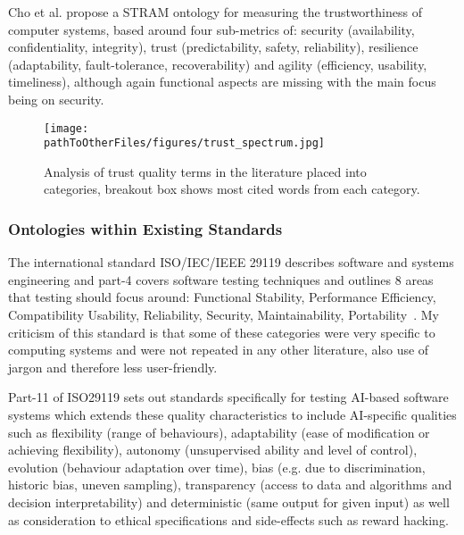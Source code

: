 Cho et al. propose a STRAM ontology for measuring the trustworthiness of computer systems, based around four sub-metrics of: security (availability, confidentiality, integrity), trust (predictability, safety, reliability), resilience (adaptability, fault-tolerance, recoverability) and agility (efficiency, usability, timeliness), although again functional aspects are missing with the main focus being on security.

\begin{figure*}[]
    \centering
    \texttt{[image: \\pathToOtherFiles/figures/trust\_spectrum.jpg]}
    \caption{Analysis of trust quality terms in the literature placed into categories, breakout box shows most cited words from each category.}
    \label{fig:trust_spectrum}
\end{figure*}


\subsubsection{Ontologies within Existing Standards}

The international standard ISO/IEC/IEEE 29119 describes software and systems engineering and part-4 covers software testing techniques and outlines 8 areas that testing should focus around: Functional Stability, Performance Efficiency, Compatibility
Usability, Reliability, Security, Maintainability, Portability~\cite{ISO29119}. 
%
My criticism of this standard is that some of these categories were very specific to computing systems and were not repeated in any other literature, also use of jargon and therefore less user-friendly. 

Part-11 of ISO29119 sets out standards specifically for testing AI-based software systems which extends these quality characteristics to include AI-specific qualities such as flexibility (range of behaviours), adaptability (ease of modification or achieving flexibility), autonomy (unsupervised ability and level of control), evolution (behaviour adaptation over time), bias (e.g. due to discrimination, historic bias, uneven sampling), transparency (access to data and algorithms and decision interpretability) and deterministic (same output for given input) as well as consideration to ethical specifications and side-effects such as reward hacking. 

